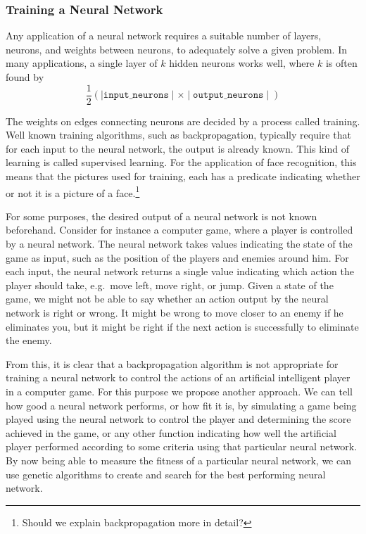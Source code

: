 \subsubsection{Training a Neural Network}
Any applica\-tion of a neural network requires a suitable number of layers, neurons, and weights between neurons, to adequately solve a given problem. In many applications, a single layer of $k$ hidden neurons works well, where $k$ is often found by\citpls{}
\[
  \frac{1}{2}\left(\mid\mathtt{input\_neurons}\mid \times \mid\mathtt{output\_neurons}\mid\right)
\]

The weights on edges connecting neurons are decided by a process called training. Well known training algorithms, such as backpropagation, typically require that for each input to the neural network, the output is already known. This kind of learning is called supervised learning. For the application of face recognition, this means that the pictures used for training, each has a predicate indicating whether or not it is a picture of a face.\footnote{Should we explain backpropagation more in detail?}

For some purposes, the desired output of a neural network is not known beforehand. Consider for instance a computer game, where a player is controlled by a neural network. The neural network takes values indicating the state of the game as input, such as the position of the players and enemies around him. For each input, the neural network returns a single value indicating which action the player should take, e.g.\ move left, move right, or jump. Given a state of the game, we might not be able to say whether an action output by the neural network is right or wrong. It might be wrong to move closer to an enemy if he eliminates you, but it might be right if the next action is successfully to eliminate the enemy.

From this, it is clear that a backpropagation algorithm is not appropriate for training a neural network to control the actions of an artificial intelligent player in a computer game. For this purpose we propose another approach. We can tell how good a neural network performs, or how fit it is, by simulating a game being played using the neural network to control the player and determining the score achieved in the game, or any other function indicating how well the artificial player performed according to some criteria using that particular neural network. By now being able to measure the fitness of a particular neural network, we can use genetic algorithms to create and search for the best performing neural network.


